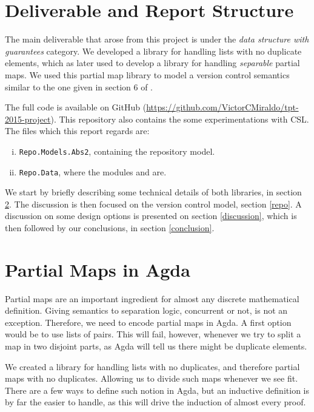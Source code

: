 \documentclass{llncs}
\newcommand{\F}[1]{\AgdaFunction{#1}}
\begin{document}
\section{Deliverable and Report Structure}

The main deliverable that arose from this project is under 
the \emph{data structure with guarantees} category. We developed a library
for handling lists with no duplicate elements, which as later used to
develop a library for handling \emph{separable} partial maps. 
We used this partial map library to model a version control semantics similar
to the one given in section 6 of \citeSwierstra.

The full code is available on GitHub (\url{https://github.com/VictorCMiraldo/tpt-2015-project}).
This repository also contains the some experimentations with CSL. The files which this report regards
are:
\begin{enumerate}[i)]
  \item \texttt{\small Repo.Models.Abs2}, containing the repository model.
  \item \texttt{\small Repo.Data}, where the modules \F{List1} and \F{PMap1} are.
\end{enumerate}

We start by briefly describing some technical details of both libraries, in section \ref{pmaps}. The discussion is then focused on the version control model, section \ref{repo}.
A discussion on some design options is presented on section \ref{discussion}, which
is then followed by our conclusions, in section \ref{conclusion}.

\section{Partial Maps in Agda}
\label{pmaps}

Partial maps are an important ingredient for almost any discrete mathematical definition.
Giving semantics to separation logic, concurrent or not, is not an exception. Therefore,
we need to encode partial maps in Agda. A first option would be to use lists of pairs.
This will fail, however, whenever we try to split a map in two disjoint parts, as Agda
will tell us there might be duplicate elements.

We created a library for handling lists with no duplicates, and therefore partial maps
with no duplicates. Allowing us to divide such maps whenever we see fit. 
There are a few ways to define such notion in Agda, but an inductive definition
is by far the easier to handle, as this will drive the induction of almost every proof.
\end{document}
